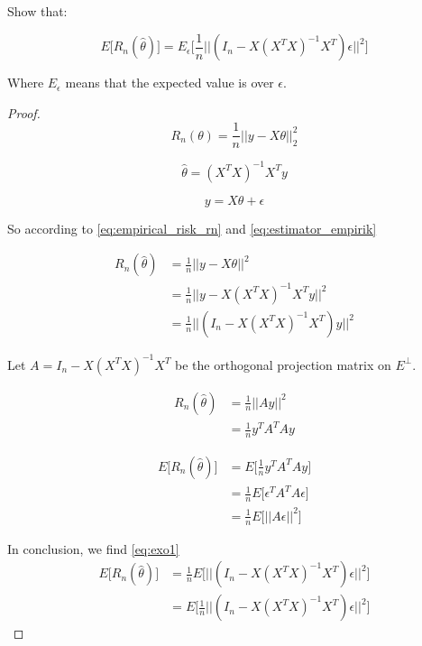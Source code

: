 

Show that:

\begin{equation} \label{eq:exo1}
    E \Big[ R_n (\hat{\theta}) \Big] = E_\epsilon \Big[ \frac{1}{n} || (I_n - X (X^T X)^{-1} X^T) \epsilon ||^2 \Big]
\end{equation}

Where $E_\epsilon$ means that the expected value is over $\epsilon$.\\

\begin{proof}
    \begin{equation} \label{eq:empirical_risk_rn}
        R_n(\theta) = \frac{1}{n} || y - X \theta ||^2_2
    \end{equation}
    
    
    \begin{equation} \label{eq:estimator_empirik}
        \hat{\theta} = (X^T X)^{-1} X^T y
    \end{equation}

    \begin{equation} \label{eq:linear_model}
        y = X \theta + \epsilon
    \end{equation}

    So according to \eqref{eq:empirical_risk_rn} and \eqref{eq:estimator_empirik}
    
    \begin{align*}
        R_n (\hat{\theta}) &= \frac{1}{n} || y - X \theta ||^2\\
            &= \frac{1}{n} || y - X (X^TX)^{-1} X^T y ||^2\\
            &= \frac{1}{n} || (I_n - X (X^TX)^{-1} X^T) y ||^2
    \end{align*}

    Let $A = I_n - X (X^T X)^{-1} X^T$ be the orthogonal projection matrix on $E^\perp$.

    \begin{align*}
        R_n (\hat{\theta}) &= \frac{1}{n} || A y ||^2\\
            &= \frac{1}{n} y^T A^T A y 
    \end{align*}

    
    \begin{align*}
         E \Big[ R_n (\hat{\theta}) \Big] &= E \Big [ \frac{1}{n} y^T A^T A y \Big ] \\
            &= \frac{1}{n}  E \Big [  \epsilon^T A^T A \epsilon \Big ] \\
            &= \frac{1}{n}  E \Big [  || A \epsilon  ||^2 \Big ]
    \end{align*}

    In conclusion, we find \eqref{eq:exo1}
    \begin{align*}
        E \Big[ R_n (\hat{\theta}) \Big] &= \frac{1}{n}  E \Big [  || (I_n - X (X^T X)^{-1} X^T) \epsilon  ||^2 \Big ] \\
            &= E \Big [ \frac{1}{n}    || (I_n - X (X^T X)^{-1} X^T) \epsilon  ||^2 \Big ]
    \end{align*}
    
\end{proof}

